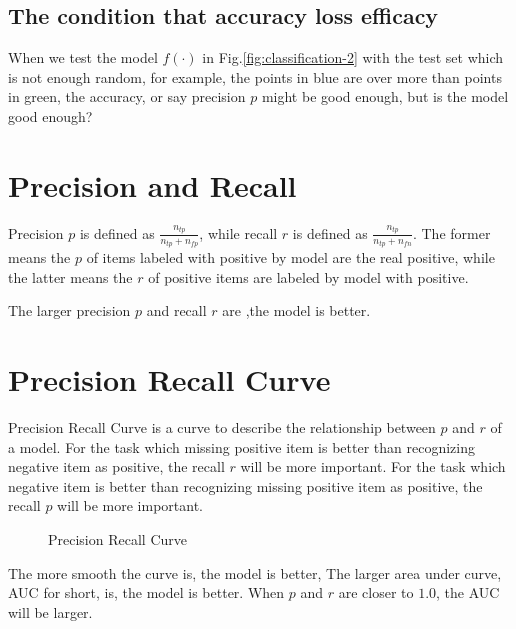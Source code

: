 \subsection{The condition that accuracy loss efficacy}
\label{sec:4rt:eg}

When we test the model $f(\cdot)$ in Fig.\ref{fig:classification-2} with the test set which is not enough random,
for example, the points in blue are over more than points in green,
the accuracy, or say precision $p$ might be good enough, but is the model good enough?

\section{Precision and Recall}
\label{sec:pr}

Precision $p$ is defined as $\frac{n_{tp}}{n_{tp} + n_{fp}}$, while recall $r$ is defined
as $\frac{n_{tp}}{n_{tp} + n_{fn}}$. The former means the $p$ of items labeled with positive
by model are the real positive, while the latter means the $r$ of positive items are labeled
by model with positive.

The larger precision $p$ and recall $r$ are ,the model is better.

\section{Precision Recall Curve}
\label{sec:prc}

Precision Recall Curve is a curve to describe the relationship between $p$ and $r$ of a model.
For the task which missing positive item is better than recognizing negative item as positive,
the recall $r$ will be more important. For the task which negative item is better than
recognizing missing positive item as positive, the recall $p$ will be more important.
\begin{figure}
    \centering
    \caption{Precision Recall Curve}
    \label{fig:prc-1}
\end{figure}
The more smooth the curve is, the model is better,
The larger area under curve, AUC for short, is, the model is better.
When $p$ and $r$ are closer to $1.0$, the AUC will be larger.
        
